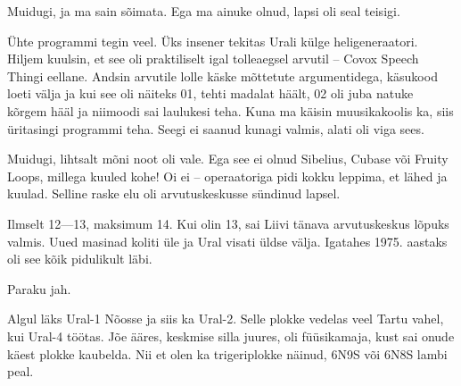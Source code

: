 
Muidugi, ja ma sain sõimata. Ega ma ainuke olnud, lapsi oli seal
teisigi.

Ühte programmi tegin veel. Üks insener 
tekitas Urali külge heligeneraatori. Hiljem kuulsin, et 
see oli praktiliselt igal tolleaegsel arvutil -- Covox Speech 
Thingi 
eellane. Andsin arvutile lolle käske 
mõttetute argumentidega, käsukood loeti välja ja kui see oli näiteks 01, tehti 
madalat häält, 02 oli juba natuke kõrgem hääl ja niimoodi sai laulukesi 
teha. Kuna ma käisin muusikakoolis ka, siis üritasingi programmi teha. 
Seegi ei saanud kunagi valmis, alati oli viga sees. 


Muidugi, lihtsalt mõni noot oli vale. Ega see ei olnud 
Sibelius, Cubase või Fruity Loops, millega kuuled kohe! Oi ei -- operaatoriga pidi kokku leppima, et lähed ja kuulad. 
Selline raske elu oli arvutuskeskusse sündinud lapsel. 


Ilmselt 12---13, maksimum 
14. Kui olin 13, sai Liivi tänava arvutuskeskus lõpuks valmis. Uued masinad koliti üle 
ja Ural visati üldse välja. Igatahes 1975. 
aastaks oli see kõik pidulikult läbi. 


Paraku jah. 

Algul läks Ural-1 
Nõosse ja siis ka Ural-2. Selle
plokke vedelas veel Tartu vahel, kui Ural-4 töötas. Jõe 
ääres, keskmise silla juures, oli füüsikamaja, kust sai onude 
käest plokke kaubelda. Nii et olen ka trigeriplokke 
näinud, 6N9S või 6N8S lambi peal. 

